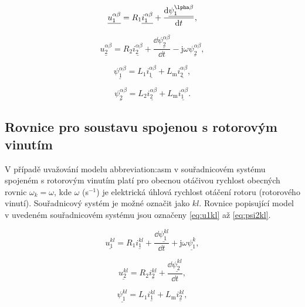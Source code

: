 \documentclass[a4paper, twoside, 11pt]{article}
\begin{document}
 \begin{equation}\label{eq:u1alphabeta}
     \underline{u_{1}^{\alpha\beta}} = R_1 \underline{i_1^{\alpha\beta}} + \frac{\dd{\underline{\psi_1^{\lpha\beta}}}}{\dd{t}},
    \end{equation}

    \begin{equation}
        \underline{u_{2}^{\alpha\beta}} = R_2 \underline{i_2^{\alpha\beta}} + \frac{\dd{\underline{\psi_2^{\alpha\beta}}}}{\dd{t}} - \text{j} \omega \underline{\psi_2^{\alpha\beta}},
    \end{equation}

    \begin{equation}
        \underline{\psi_1^{\alpha\beta}} = L_1 \underline{i_1^{\alpha\beta}} + L_\text{m} \underline{i_2^{\alpha\beta}},
    \end{equation}

    \begin{equation}\label{eq:psi2alphabeta}
        \underline{\psi_2^{\alpha\beta}} = L_2 \underline{i_2^{\alpha\beta}} + L_\text{m} \underline{i_1^{\alpha\beta}}.
    \end{equation}
    \subsection{Rovnice pro soustavu spojenou s rotorovým vinutím}
    V případě uvažování modelu \gls{abbreviation:asm} v souřadnicovém systému spojeném s rotorovým vinutím platí pro obecnou otáčivou rychlost obecných rovnic $\omega_k = \omega$, kde $\omega$ (s$^{-1}$) je elektrická úhlová rychlost otáčení rotoru (rotorového vinutí). Souřadnicový systém je možné označit jako $kl$. Rovnice popisující model v uvedeném souřadnicovém systému jsou označeny \ref{eq:u1kl} až \ref{eq:psi2kl}.\par

 \begin{equation}\label{eq:u1kl}
     \underline{u_{1}^{kl}} = R_1 \underline{i_1^{kl}} + \frac{\dd{\underline{\psi_1^{kl}}}}{\dd{t}} + \text{j} \omega \underline{\psi_1^{k}},
    \end{equation}

    \begin{equation}
        \underline{u_{2}^{kl}} = R_2 \underline{i_2^{kl}} + \frac{\dd{\underline{\psi_2^{kl}}}}{\dd{t}},
    \end{equation}

    \begin{equation}
        \underline{\psi_1^{kl}} = L_1 \underline{i_1^{kl}} + L_\text{m} \underline{i_2^{kl}},
    \end{equation}
\end{document}
